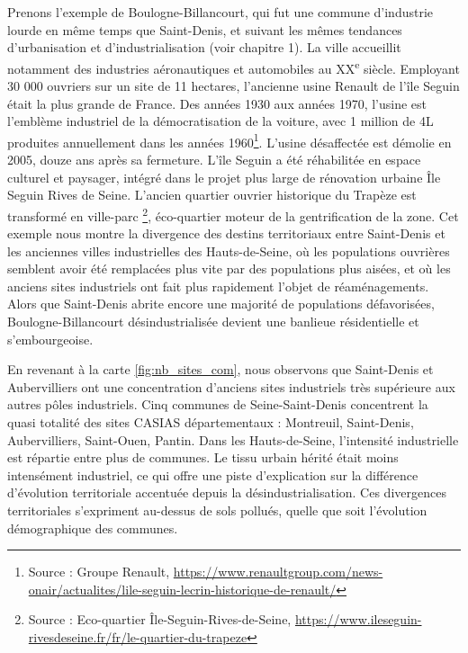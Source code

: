 \documentclass[a4paper,twoside,12pt]{book}
\newcommand{\siecle}[1]{\textsc{#1}\textsuperscript{e} siècle}
\begin{document}
Prenons l'exemple de Boulogne-Billancourt, qui fut une commune d'industrie lourde en même temps que Saint-Denis, et suivant les mêmes tendances d'urbanisation et d'industrialisation (voir chapitre 1). La ville accueillit notamment des industries aéronautiques et automobiles au \siecle{XX}. Employant 30 000 ouvriers sur un site de 11 hectares, l'ancienne usine Renault de l'île Seguin était la plus grande de France. Des années 1930 aux années 1970, l'usine est l'emblème industriel de la démocratisation de la voiture, avec 1 million de 4L produites annuellement dans les années 1960\footnote{Source : Groupe Renault, \url{https://www.renaultgroup.com/news-onair/actualites/lile-seguin-lecrin-historique-de-renault/}}.  L'usine désaffectée est démolie en 2005, douze ans après sa fermeture. L'île Seguin a été réhabilitée en espace culturel et paysager, intégré dans le projet plus large de rénovation urbaine \og{} Île Seguin Rives de Seine\fg{}. L'ancien quartier ouvrier historique du Trapèze est transformé en \og{} ville-parc \fg{}\footnote{Source : Eco-quartier Île-Seguin-Rives-de-Seine, \url{https://www.ileseguin-rivesdeseine.fr/fr/le-quartier-du-trapeze}}, éco-quartier moteur de la gentrification de la zone. Cet exemple nous montre la divergence des destins territoriaux entre Saint-Denis et les anciennes villes industrielles des Hauts-de-Seine, où les populations ouvrières semblent avoir été remplacées plus vite par des populations plus aisées, et où les anciens sites industriels ont fait plus rapidement l'objet de réaménagements. Alors que Saint-Denis abrite encore une majorité de populations défavorisées, Boulogne-Billancourt désindustrialisée devient une banlieue résidentielle et s'embourgeoise.

En revenant à la carte  \ref{fig:nb_sites_com}, nous observons que Saint-Denis et Aubervilliers ont une concentration d'anciens sites industriels très supérieure aux autres pôles industriels.  Cinq communes de Seine-Saint-Denis concentrent la quasi totalité des sites CASIAS départementaux : Montreuil, Saint-Denis, Aubervilliers, Saint-Ouen, Pantin. Dans les Hauts-de-Seine, l'intensité industrielle est répartie entre plus de communes. Le tissu urbain hérité était moins intensément industriel, ce qui offre une piste d'explication sur la différence d'évolution territoriale accentuée depuis la désindustrialisation. Ces divergences territoriales s'expriment au-dessus de sols pollués, quelle que soit l'évolution démographique des communes. 
\end{document}

